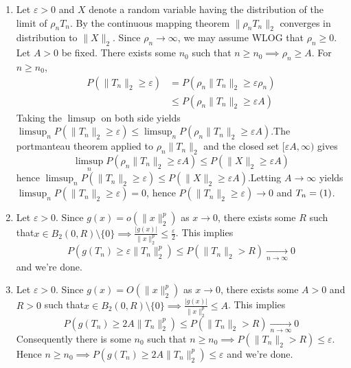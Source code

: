 \documentclass[a4paper,11pt]{article}
\let\o\relax
\DeclareMathOperator*{\o}{\mathit o_{\mathbb P}}
\begin{document}
\begin{enumerate}
  \item Let $\varepsilon >0$ and $X$ denote a random variable having the distribution of the limit of $\rho_n T_n$. By the continuous mapping theorem $\|\rho_n T_n\|_2$ converges in distribution to $\|X\|_2$. Since $\rho_n\to \infty$, we may assume WLOG that $\rho_n\geq 0$. Let $A>0$ be fixed. There exists some $n_0$ such that $n\geq n_0 \implies \rho_n \geq A$. For $n\geq n_0$, 
  $$\begin{aligned}
    P(\|T_n\|_2 \geq \varepsilon) &= P(\rho_n\|T_n\|_2 \geq \varepsilon\rho_n)\\
    &\leq P(\rho_n\|T_n\|_2 \geq \varepsilon A)
  \end{aligned}$$
  Taking the $\limsup$ on both side yields $\limsup_n P(\|T_n\|_2 \geq \varepsilon) \leq \limsup_n P(\rho_n\|T_n\|_2 \geq \varepsilon A)$.\newline The portmanteau theorem applied to $\rho_n\|T_n\|_2$ and the closed set $[\varepsilon A, \infty)$ gives $$\limsup_n P(\rho_n\|T_n\|_2 \geq \varepsilon A) \leq P(\|X\|_2 \geq \varepsilon A)$$
  hence $\limsup_n P(\|T_n\|_2 \geq \varepsilon) \leq P(\|X\|_2 \geq \varepsilon A)$.\newline Letting $A\to \infty$ yields $\limsup_n P(\|T_n\|_2 \geq \varepsilon) = 0$, hence $P(\|T_n\|_2 \geq \varepsilon)\to 0$ and $T_n=\o(1)$. 

  \item Let $\varepsilon >0$. Since $g(x)=o(\|x\|_2^p)$ as $x\to 0$, there exists some $R$ such that\newline $x\in B_2(0,R)\setminus\{0\}\implies \frac{|g(x)|}{\|x\|_2^p}\leq \frac \varepsilon 2$. This implies 
  $$
  P(g(T_n)\geq \varepsilon \|T_n\|_2^p) \leq P(\|T_n\|_2> R) \xrightarrow[n\to \infty]{} 0
  $$
  and we're done.

  \item Let $\varepsilon >0$. Since $g(x)=O(\|x\|_2^p)$ as $x\to 0$, there exists some $A>0$ and $R>0$ such that\newline $x\in B_2(0,R)\setminus\{0\}\implies \frac{|g(x)|}{\|x\|_2^p}\leq A$. This implies 
  $$
  P(g(T_n)\geq 2A \|T_n\|_2^p) \leq P(\|T_n\|_2> R) \xrightarrow[n\to \infty]{} 0
  $$
  Consequently there is some $n_0$ such that $n\geq n_0 \implies P(\|T_n\|_2> R) \leq \varepsilon$. Hence $n\geq n_0 \implies P(g(T_n)\geq 2A \|T_n\|_2^p) \leq \varepsilon$ and we're done.


\end{enumerate}
\end{document}
